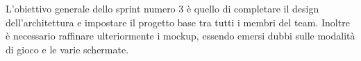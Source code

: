 L'obiettivo generale dello sprint numero 3 è quello di completare il design dell'architettura e impostare il progetto base tra tutti i membri del team. Inoltre è necessario raffinare ulteriormente i mockup, essendo emersi dubbi sulle modalità di gioco e le varie schermate.  